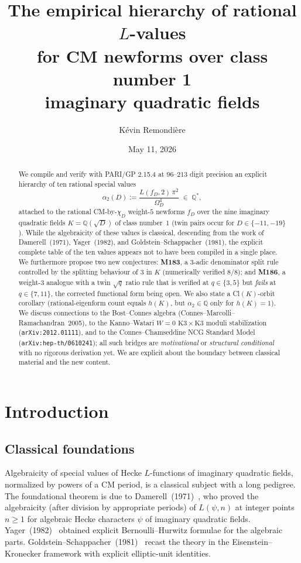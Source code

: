\documentclass[12pt]{amsart}
\title[Hierarchy of rational $L$-values for CM newforms]{The empirical hierarchy of rational $L$-values\\
       for CM newforms over class number 1\\
       imaginary quadratic fields}
\author[K. Remondière]{Kévin Remondière}
\date{May 11, 2026}
\theoremstyle{definition}
\newcommand{\Q}{\mathbb{Q}}
\begin{document}
\begin{abstract}
We compile and verify with PARI/GP 2.15.4 at $96$--$213$ digit precision an
explicit hierarchy of ten rational special values
\[
  \alpha_2(D) := \frac{L(f_D,2)\,\pi^2}{\Omega_D^4} \;\in\; \Q^*,
\]
attached to the rational CM-by-$\chi_D$ weight-$5$ newforms $f_D$ over the
nine imaginary quadratic fields $K = \Q(\sqrt{D})$ of class number~$1$
(twin pairs occur for $D \in \{-11,-19\}$).
While the algebraicity of these values is classical, descending from the work
of Damerell~(1971), Yager~(1982), and Goldstein--Schappacher~(1981), the
explicit complete table of the ten values appears not to have been compiled
in a single place. We furthermore propose two new conjectures:
\textbf{M183}, a $3$-adic denominator split rule controlled by the splitting
behaviour of $3$ in $K$ (numerically verified $8/8$); and \textbf{M186}, a
weight-$3$ analogue with a twin $\sqrt{q}$ ratio rule that is verified at
$q \in \{3,5\}$ but \emph{fails} at $q \in \{7,11\}$, the corrected
functional form being open. We also state a Cl$(K)$-orbit corollary
(rational-eigenform count equals $h(K)$, but $\alpha_2 \in \Q$ only for
$h(K)=1$).
We discuss connections to the Bost--Connes algebra
(Connes--Marcolli--Ramachandran~2005), to the Kanno--Watari $W=0$
$\mathrm{K3}\times\mathrm{K3}$ moduli stabilization
(\texttt{arXiv:2012.01111}), and to the Connes--Chamseddine NCG Standard
Model (\texttt{arXiv:hep-th/0610241}); all such bridges are
\emph{motivational} or \emph{structural conditional} with no rigorous
derivation yet. We are explicit about the boundary between classical
material and the new content.
\end{abstract}

\maketitle
\tableofcontents

\section{Introduction}
\label{sec:intro}

\subsection{Classical foundations}

Algebraicity of special values of Hecke $L$-functions of imaginary
quadratic fields, normalized by powers of a CM period, is a classical
subject with a long pedigree. The foundational theorem is due to
Damerell~(1971)~\cite{Damerell1971}, who proved the algebraicity (after
division by appropriate periods) of $L(\psi, n)$ at integer points $n \geq 1$
for algebraic Hecke characters $\psi$ of imaginary quadratic fields.
Yager~(1982)~\cite{Yager1982} obtained explicit Bernoulli--Hurwitz formulae
for the algebraic parts. Goldstein--Schappacher~(1981)~\cite{GoldsteinSchappacher1981}
recast the theory in the Eisenstein--Kronecker framework with explicit
elliptic-unit identities.
\end{document}
